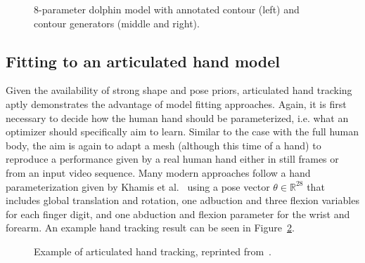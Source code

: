        \begin{figure}[H] %
            \caption{8-parameter dolphin model with annotated contour (left) and contour generators (middle and right).}
            \label{fig:cashman_fitzgibbon}
        \end{figure}

    \subsection{Fitting to an articulated hand model}
        Given the availability of strong shape and pose priors, articulated hand tracking aptly demonstrates the advantage of model fitting approaches. Again, it is first necessary to decide how the human hand should be parameterized, i.e. what an optimizer should specifically aim to learn. Similar to the case with the full human body, the aim is again to adapt a mesh (although this time of a hand) to reproduce a performance given by a real human hand either in still frames or from an input video sequence. Many modern approaches follow a hand parameterization given by Khamis et al.~\cite{Khamis_2015_CVPR} using a pose vector $\theta \in \mathbb{R}^{28}$ that includes global translation and rotation, one adbuction and three flexion variables for each finger digit, and one abduction and flexion parameter for the wrist and forearm. An example hand tracking result can be seen in Figure~\ref{fig:hand_tracking}. 

        \begin{figure}[H] %
            \caption{Example of articulated hand tracking, reprinted from~\cite{taylor2016efficient}.}
            \label{fig:hand_tracking}
        \end{figure}

